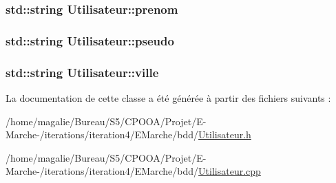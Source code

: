 \hypertarget{class_utilisateur_a7cbd4b405cdff4fed665d74ddca1a61f}{
\subsubsection[{prenom}]{\setlength{\rightskip}{0pt plus 5cm}std\-::string Utilisateur\-::prenom\hspace{0.3cm}{\ttfamily [protected]}}}\label{class_utilisateur_a7cbd4b405cdff4fed665d74ddca1a61f}
\hypertarget{class_utilisateur_acefb31a3f7e204657236a73770e4b36c}{
\subsubsection[{pseudo}]{\setlength{\rightskip}{0pt plus 5cm}std\-::string Utilisateur\-::pseudo\hspace{0.3cm}{\ttfamily [protected]}}}\label{class_utilisateur_acefb31a3f7e204657236a73770e4b36c}
\hypertarget{class_utilisateur_ad5a26fdf60b16be6d077aecd582edaab}{
\subsubsection[{ville}]{\setlength{\rightskip}{0pt plus 5cm}std\-::string Utilisateur\-::ville\hspace{0.3cm}{\ttfamily [protected]}}}\label{class_utilisateur_ad5a26fdf60b16be6d077aecd582edaab}


La documentation de cette classe a été générée à partir des fichiers suivants \-:\begin{DoxyCompactItemize}
\item 
/home/magalie/\-Bureau/\-S5/\-C\-P\-O\-O\-A/\-Projet/\-E-\/\-Marche-\//iterations/iteration4/\-E\-Marche/bdd/\hyperlink{_utilisateur_8h}{Utilisateur.\-h}\item 
/home/magalie/\-Bureau/\-S5/\-C\-P\-O\-O\-A/\-Projet/\-E-\/\-Marche-\//iterations/iteration4/\-E\-Marche/bdd/\hyperlink{_utilisateur_8cpp}{Utilisateur.\-cpp}\end{DoxyCompactItemize}
